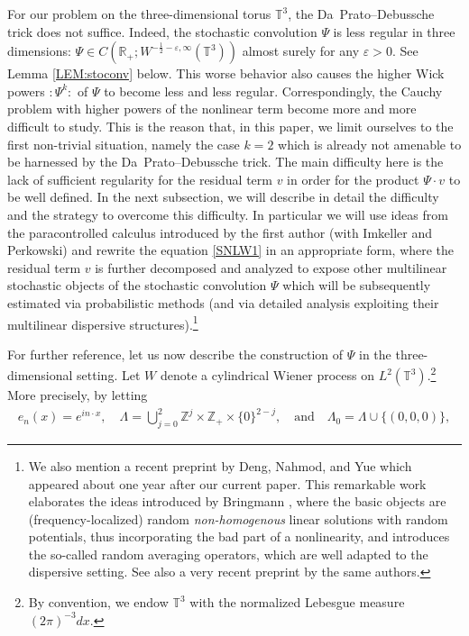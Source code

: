 \documentclass[%
11pt,  reqno]{amsart}
\newcommand{\1}{\hspace{0.2mm}\text{I}\hspace{0.2mm}}
\newcommand{\Z}{\mathbb{Z}}
\newcommand{\R}{\mathbb{R}}
\newcommand{\T}{\mathbb{T}}
\newcommand{\eps}{\varepsilon}
\newcommand{\Ld}{\Lambda}
\numberwithin{equation}{section}
\numberwithin{theorem}{section}
\begin{document}
For our problem on the three-dimensional torus $\T^3$, 
 the Da~Prato--Debussche trick does not suffice.
Indeed,  the stochastic convolution $\Psi$ 
is less regular in three dimensions: $\Psi \in C(\R_+; W^{-\frac{1}{2}-\eps, \infty}(\T^3))$ 
almost surely for any $\eps > 0$.
See Lemma \ref{LEM:stoconv} below. 
This worse behavior also causes  the higher Wick powers $:\!\Psi^k\!:$ of $\Psi$ 
to become less and less regular. 
Correspondingly, the Cauchy problem with higher powers of the nonlinear term become more and more difficult to study. 
This is the reason that, in this paper, we limit ourselves to the first non-trivial situation,
namely the case $k=2$ which is already not amenable to be harnessed by the Da~Prato--Debussche trick. 
The main difficulty here is the lack of sufficient regularity for 
the residual term $v$ in order for the product $\Psi \cdot v$ to be well defined. 
In the next subsection, we will describe in detail the difficulty and the strategy  to overcome this difficulty.
In particular we will use ideas from the paracontrolled calculus introduced
by the first author (with Imkeller and Perkowski) \cite{GIP, CC}
and rewrite the equation \eqref{SNLW1} in an appropriate form,
 where the residual term $v$ is further decomposed and analyzed to expose 
 other multilinear stochastic objects of the stochastic convolution $\Psi$ which will be subsequently estimated via probabilistic methods (and via detailed analysis exploiting  their multilinear dispersive structures).\footnote{We also mention a recent preprint \cite{DNY1} by Deng, Nahmod, and Yue
 which appeared about one year after our current paper.  This remarkable work \cite{DNY1}
 elaborates %
 the ideas introduced by  Bringmann \cite{Bringmann}, 
 where the basic objects are (frequency-localized) random {\it non-homogenous} linear solutions
 with random potentials, 
 thus incorporating the bad part of a nonlinearity, 
  and introduces the so-called random averaging operators, 
 which are well adapted to the dispersive setting.
See also a very recent preprint \cite{DNY2} by the same authors.}

 


For further reference,
 let us now describe  the construction of $\Psi$ in the three-dimensional setting. 
 Let  $W$ denote a cylindrical Wiener process on $L^2(\T^3)$.\footnote{By convention, 
 we endow $\T^3$ with the normalized Lebesgue measure $(2\pi)^{-3} dx$.}
More precisely, by letting %
\begin{align}
e_n(x) = e^{ i n \cdot x}, \quad 
\Ld = \bigcup_{j=0}^{2} \Z^j\times \Z_{+}\times \{0\}^{2-j}, 
\quad \text{and}\quad \Ld_0 = \Ld \cup\{(0, 0, 0)\},
\label{index}
\end{align}
\end{document}
